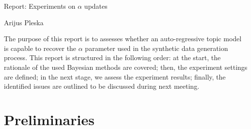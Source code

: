 \documentclass[12pt]{article}
\begin{document}
\begingroup  
  \centering
  \large Report: Experiments on $\alpha$ updates \par
  \large Arijus Pleska \par
\endgroup

\par The purpose of this report is to assesses whether an auto-regressive topic model is capable to recover the $\alpha$ parameter used in the synthetic data generation process. This report is structured in the following order: at the start, the rationale of the used Bayesian methods are covered; then, the experiment settings are defined; in the next stage, we assess the experiment results; finally, the identified issues are outlined to be discussed during next meeting.

\section*{Preliminaries}
\end{document}
